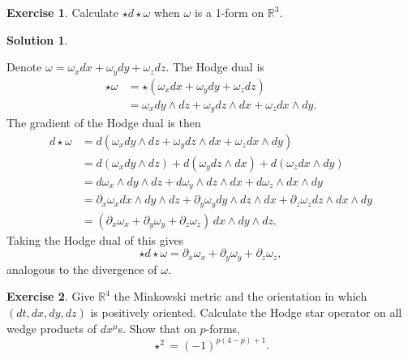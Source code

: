 \documentclass[11pt, a4paper]{report}
\theoremstyle{definition}
\newtheorem{ex}{Exercise}[part]
\newtheorem{sol}{Solution}[part]
\begin{document}
\begin{ex}

Calculate $\star d \star \omega$ when $\omega$ is a 1-form on $\mathbb{R}^3$.

\end{ex}

\begin{sol}\label{sol:divergence1form}

Denote $\omega = \omega_x dx + \omega_y dy + \omega_z dz$. The Hodge dual is
\begin{align*}
    \star \omega &= \star (\omega_x dx + \omega_y dy + \omega_z dz) \\
        &= \omega_x dy \wedge dz + \omega_y dz \wedge dx + \omega_z dx \wedge dy.
\end{align*}
The gradient of the Hodge dual is then
\begin{align*}
    d \star \omega &= d(\omega_x dy \wedge dz + \omega_y dz \wedge dx + \omega_z dx \wedge dy) \\
        &= d(\omega_x dy \wedge dz) + d(\omega_y dz \wedge dx) + d(\omega_z dx \wedge dy) \\
        &= d\omega_x \wedge dy \wedge dz + d\omega_y \wedge dz \wedge dx + d\omega_z \wedge dx \wedge dy \\
        &= \partial_x \omega_x dx \wedge dy \wedge dz + \partial_y \omega_y dy \wedge dz \wedge dx + \partial_z \omega_z dz \wedge dx \wedge dy \\
        &= (\partial_x \omega_x + \partial_y \omega_y + \partial_z \omega_z) \, dx \wedge dy \wedge dz.
\end{align*}
Taking the Hodge dual of this gives
\[
    \star d \star \omega = \partial_x \omega_x + \partial_y \omega_y + \partial_z \omega_z,
\]
analogous to the divergence of $\omega$.

\end{sol}

\begin{ex}

Give $\mathbb{R}^4$ the Minkowski metric and the orientation in which $(dt, dx, dy, dz)$ is positively oriented. Calculate the Hodge star operator on all wedge products of $dx^\mu$s. Show that on $p$-forms,
\[
    \star^2 = {(-1)}^{p (4 - p) + 1}.
\]

\end{ex}
\end{document}
